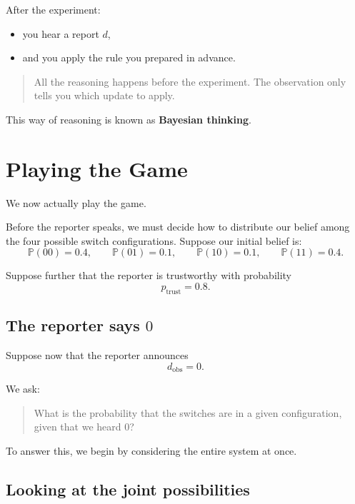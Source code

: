\documentclass[11pt]{article}
\theoremstyle{remark}
\begin{document}
After the experiment:
\begin{itemize}
    \item you hear a report \(d\),
    \item and you apply the rule you prepared in advance.
\end{itemize}

\vspace{2mm}

\begin{quote}
All the reasoning happens before the experiment.
The observation only tells you which update to apply.
\end{quote}

This way of reasoning is known as \textbf{Bayesian thinking}.

\section{Playing the Game}

We now actually play the game.

Before the reporter speaks, we must decide how to distribute our belief among the four possible switch configurations. Suppose our initial belief is:
\[
\mathbb P(00)=0.4,\qquad
\mathbb P(01)=0.1,\qquad
\mathbb P(10)=0.1,\qquad
\mathbb P(11)=0.4.
\]

Suppose further that the reporter is trustworthy with probability
\[
p_{\mathrm{trust}} = 0.8.
\]

\vspace{2mm}

\subsection{The reporter says \(0\)}

Suppose now that the reporter announces
\[
d_{\mathrm{obs}} = 0.
\]

We ask:

\begin{quote}
What is the probability that the switches are in a given configuration, given that we heard \(0\)?
\end{quote}

To answer this, we begin by considering the entire system at once.

\vspace{2mm}

\subsection{Looking at the joint possibilities}
\end{document}
